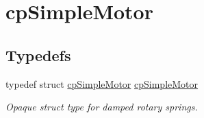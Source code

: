 \hypertarget{group__cp_simple_motor}{}\section{cp\+Simple\+Motor}
\label{group__cp_simple_motor}
\subsection*{Typedefs}
\begin{DoxyCompactItemize}
\item 
\mbox{\label{group__cp_simple_motor_ga0b1689742ce8e31d9a4b3bcae83db2e7}} 
typedef struct \mbox{\hyperlink{structcp_simple_motor}{cp\+Simple\+Motor}} \mbox{\hyperlink{group__cp_simple_motor_ga0b1689742ce8e31d9a4b3bcae83db2e7}{cp\+Simple\+Motor}}
\begin{DoxyCompactList}\small\item\em Opaque struct type for damped rotary springs. \end{DoxyCompactList}\end{DoxyCompactItemize}
